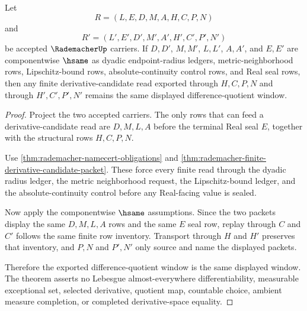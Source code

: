 \begin{theorem}
\label{thm:rademacher-difference-quotient-window-stability}
Let
$$
R=(L,E,D,M,A,H,C,P,N)
$$
and
$$
R'=(L',E',D',M',A',H',C',P',N')
$$
be accepted $\RademacherUp$ carriers. If $D,D'$, $M,M'$, $L,L'$, $A,A'$, and $E,E'$ are componentwise $\hsame$ as dyadic endpoint-radius ledgers, metric-neighborhood rows, Lipschitz-bound rows, absolute-continuity control rows, and Real seal rows, then any finite derivative-candidate read exported through $H,C,P,N$ and through $H',C',P',N'$ remains the same displayed difference-quotient window.
\end{theorem}
\begin{proof}
Project the two accepted carriers. The only rows that can feed a derivative-candidate read are $D,M,L,A$ before the terminal Real seal $E$, together with the structural rows $H,C,P,N$.

Use \autoref{thm:rademacher-namecert-obligations} and \autoref{thm:rademacher-finite-derivative-candidate-packet}. These force every finite read through the dyadic radius ledger, the metric neighborhood request, the Lipschitz-bound ledger, and the absolute-continuity control before any Real-facing value is sealed.

Now apply the componentwise $\hsame$ assumptions. Since the two packets display the same $D,M,L,A$ rows and the same $E$ seal row, replay through $C$ and $C'$ follows the same finite row inventory. Transport through $H$ and $H'$ preserves that inventory, and $P,N$ and $P',N'$ only source and name the displayed packets.

Therefore the exported difference-quotient window is the same displayed window. The theorem asserts no Lebesgue almost-everywhere differentiability, measurable exceptional set, selected derivative, quotient map, countable choice, ambient measure completion, or completed derivative-space equality.
\end{proof}

